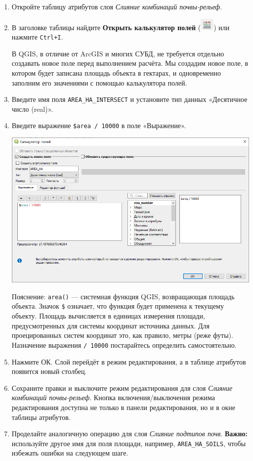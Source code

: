 \documentclass[
  12pt,
]{book}
\begin{document}
\begin{enumerate}
\def\labelenumi{\arabic{enumi}.}
\item
  Откройте таблицу атрибутов слоя \emph{Слияние комбинаций почвы-рельеф}.
\item
  В заголовке таблицы найдите \textbf{Открыть калькулятор полей} (\includegraphics{images/Ex06/fieldcalc1.png}) или нажмите \texttt{Ctrl+I}.

  В QGIS, в отличие от ArcGIS и многих СУБД, не требуется отдельно создавать новое поле перед выполнением расчёта. Мы создадим новое поле, в котором будет записана площадь объекта в гектарах, и одновременно заполним его значениями с помощью калькулятора полей.
\item
  Введите имя поля \texttt{AREA\_HA\_INTERSECT} и установите тип данных «Десятичное число (real)».
\item
  Введите выражение \texttt{\$area\ /\ 10000} в поле «Выражение».

  \includegraphics{images/Ex06/fieldcalc2.png}

  Пояснение: \texttt{area()} --- системная функция QGIS, возвращающая площадь объекта. Значок \texttt{\$} означает, что функция будет применена к текущему объекту. Площадь вычисляется в единицах измерения площади, предусмотренных для системы координат источника данных. Для проецированных систем координат это, как правило, метры (реже футы). Назначение выражения \texttt{/\ 10000} постарайтесь определить самостоятельно.
\item
  Нажмите ОК. Слой перейдёт в режим редактирования, а в таблице атрибутов появится новый столбец.
\item
  Сохраните правки и выключите режим редактирования для слоя \emph{Слияние комбинаций почвы-рельеф}. Кнопка включения/выключения режима редактирования доступна не только в панели редактирования, но и в окне таблицы атрибутов.
\item
  Проделайте аналогичную операцию для слоя \emph{Слияние подтипов почв}. \textbf{Важно:} используйте другое имя для поля площади, например, \texttt{AREA\_HA\_SOILS}, чтобы избежать ошибки на следующем шаге.
\end{enumerate}
\end{document}
